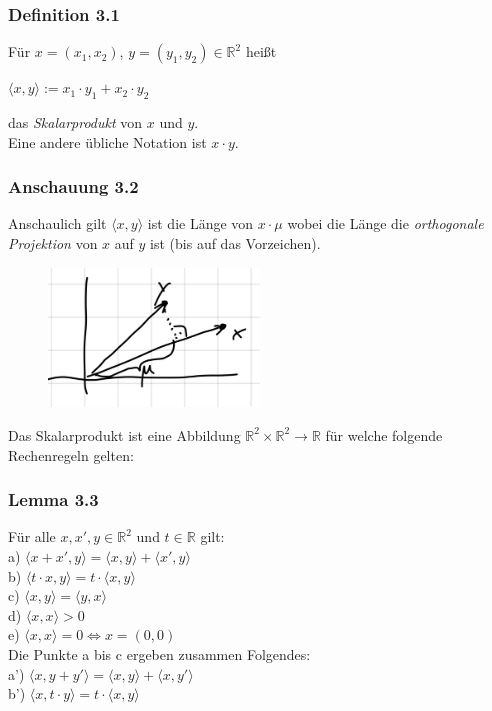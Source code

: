 \documentclass{article}
\begin{document}
\subsubsection*{Definition 3.1}
Für $x=(x_1, x_2)$, $y=(y_1, y_2) \in \mathbb{R}^2$ heißt \\
\begin{center}
    $\langle x,y \rangle := x_1 \cdot y_1 + x_2 \cdot y_2$
\end{center}
das \textit{Skalarprodukt} von $x$ und $y$. \\
Eine andere übliche Notation ist $x \cdot y$. \\

\subsubsection*{Anschauung 3.2}
Anschaulich gilt $\langle x,y \rangle$ ist die Länge von $x \cdot \mu$ wobei die Länge die \textit{orthogonale Projektion} von $x$ auf $y$ ist (bis auf das Vorzeichen). \\

\begin{figure}[h]
    \centering
    \includegraphics[width=0.5\textwidth]{Images/3.2.jpeg}
    \caption{}
\end{figure}

Das Skalarprodukt ist eine Abbildung $\mathbb{R}^2 \times \mathbb{R}^2 \rightarrow \mathbb{R}$ für welche folgende Rechenregeln gelten: \\
\subsubsection*{Lemma 3.3}
Für alle $x, x', y \in \mathbb{R}^2$ und $t \in \mathbb{R}$ gilt: \\
a) $\langle x + x', y \rangle = \langle x,y \rangle + \langle x',y \rangle$ \\
b) $\langle t \cdot x, y \rangle = t \cdot \langle x,y \rangle$ \\
c) $\langle x,y \rangle = \langle y,x \rangle$ \\
d) $\langle x,x \rangle > 0$ \\
e) $\langle x,x \rangle = 0 \Leftrightarrow x = (0,0)$ \\
Die Punkte a bis c ergeben zusammen Folgendes: \\
a') $\langle x, y+y' \rangle = \langle x,y \rangle + \langle x,y' \rangle$ \\
b') $\langle x, t \cdot y \rangle = t \cdot \langle x,y \rangle$ \\
\\
\end{document}

